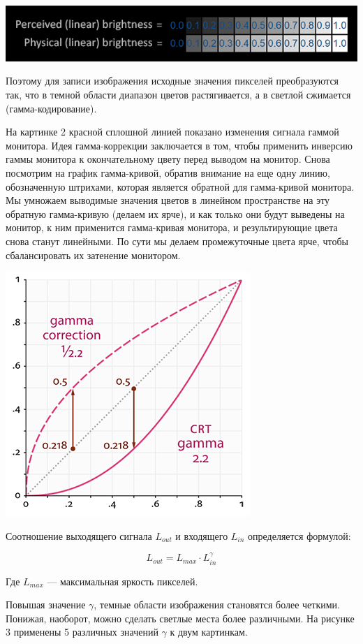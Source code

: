 \documentclass[a4paper, 12pt]{article}
\begin{document}
	\includegraphics[scale=0.6]{1}
	
	Поэтому для записи изображения исходные значения пикселей преобразуются так, что в темной области диапазон цветов растягивается, а в светлой сжимается (гамма-кодирование).
	
	На картинке 2 красной сплошной линией показано изменения сигнала гаммой монитора. Идея гамма-коррекции заключается в том, чтобы применить инверсию гаммы монитора к окончательному цвету перед выводом на монитор. Снова посмотрим на график гамма-кривой, обратив внимание на еще одну линию, обозначенную штрихами, которая является обратной для гамма-кривой монитора. Мы умножаем выводимые значения цветов в линейном пространстве на эту обратную гамма-кривую (делаем их ярче), и как только они будут выведены на монитор, к ним применится гамма-кривая монитора, и результирующие цвета снова станут линейными. По сути мы делаем промежуточные цвета ярче, чтобы сбалансировать их затенение монитором.
	
	\includegraphics[scale=0.8]{2}

	Соотношение выходящего сигнала $L_{out}$ и входящего $L_{in}$  определяется формулой:
	
	\[L_{out} = L_{max}\cdot L_{in}^{\gamma}\]
	
	Где $L_{max}$ — максимальная яркость пикселей.
	
	Повышая значение $\gamma$, темные области изображения становятся более четкими. Понижая, наоборот, можно сделать светлые места более различными. На рисунке 3 применены 5 различных значений $\gamma$ к двум картинкам.
	
\end{document}
